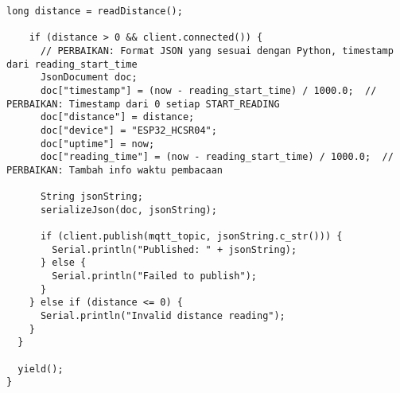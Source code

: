 \begin{itemize}
\begin{scriptsize}
\begin{lstlisting}[language=Arduino]
    long distance = readDistance();
    
    if (distance > 0 && client.connected()) {
      // PERBAIKAN: Format JSON yang sesuai dengan Python, timestamp dari reading_start_time
      JsonDocument doc;
      doc["timestamp"] = (now - reading_start_time) / 1000.0;  // PERBAIKAN: Timestamp dari 0 setiap START_READING
      doc["distance"] = distance;
      doc["device"] = "ESP32_HCSR04";
      doc["uptime"] = now;
      doc["reading_time"] = (now - reading_start_time) / 1000.0;  // PERBAIKAN: Tambah info waktu pembacaan
      
      String jsonString;
      serializeJson(doc, jsonString);
      
      if (client.publish(mqtt_topic, jsonString.c_str())) {
        Serial.println("Published: " + jsonString);
      } else {
        Serial.println("Failed to publish");
      }
    } else if (distance <= 0) {
      Serial.println("Invalid distance reading");
    }
  }
  
  yield();
}
    \end{lstlisting}

    \end{scriptsize}
\end{itemize}
